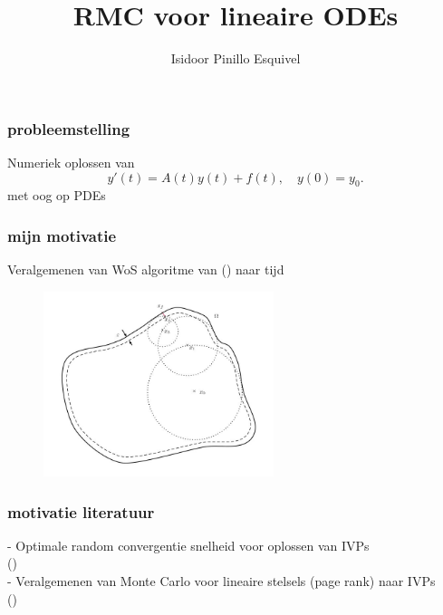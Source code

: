 \documentclass[20pt]{beamer}
\title{RMC voor lineaire ODEs}
\author{Isidoor Pinillo Esquivel }
\date{}
\begin{document}
\begin{frame}
    \titlepage
\end{frame}


\begin{frame}
    \frametitle{probleemstelling}
    Numeriek oplossen van
    \begin{equation}
        y'(t)=A(t)y(t) + f(t), \quad y(0)=y_0.
    \end{equation}
    met oog op PDEs
\end{frame}

\begin{frame}
    \frametitle{mijn motivatie}
    Veralgemenen van WoS algoritme van (\cite{sawhney_grid-free_2022})
    naar tijd
    \vspace{-0.25cm}
    \begin{figure}[h!]
        \centering
        \includegraphics[width=0.6\textwidth]{Walk_on_Spheres_illustration.jpg}
        \label{fig:Walk_on_Spheres_illustration.jpg}
    \end{figure}
\end{frame}

\begin{frame}
    \frametitle{motivatie literatuur}
    - Optimale random convergentie snelheid voor oplossen van IVPs \\
    (\cite{daun_randomized_2011}) \\
    - Veralgemenen van Monte Carlo voor lineaire stelsels (page rank)
    naar IVPs \\
    (\cite{ermakov_monte_2021})
\end{frame}
\end{document}
